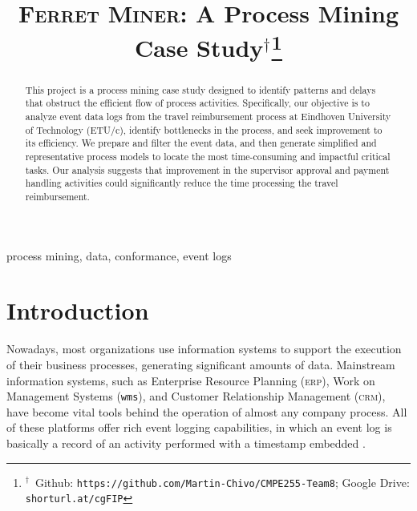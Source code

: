 \documentclass[conference]{IEEEtran}
\begin{document}
\title{\textsc{Ferret Miner}: A Process Mining Case
Study${}^\dagger$\thanks{${}^\dagger$~Github: \texttt{https://github.com/Martin-Chivo/CMPE255-Team8}; Google Drive: \texttt{shorturl.at/cgFIP}}}

\author{
\and
{}
\and
{}
\and
{}
}

\maketitle

\begin{abstract}
This project is a process mining case study designed to
identify patterns and
delays that obstruct the efficient flow of process
activities. Specifically, our
objective is to analyze event data logs from
the travel reimbursement process at Eindhoven University of Technology
(ETU/c), identify bottlenecks in the process, and
seek improvement to its efficiency.
We prepare and filter the event data, and then generate simplified and
representative process models to locate
the most time-consuming and impactful critical tasks.
Our analysis suggests that
improvement in the supervisor approval and payment handling activities 
could significantly
reduce the time processing the travel reimbursement.
\end{abstract}

\begin{IEEEkeywords}
process mining, data, conformance, event logs
\end{IEEEkeywords}

\section{Introduction}
\label{section-intro}


Nowadays, most organizations use information systems to support
the execution of their business processes, generating significant
amounts of data.
Mainstream information systems, such as Enterprise Resource
Planning (\textsc{erp}), Work on Management Systems (\texttt{wms}), and Customer
Relationship Management (\textsc{crm}), have become vital tools behind the
operation of almost 
any company process\cite{Tuto2022}. All of these platforms
offer rich event logging capabilities, in which
an event log is
basically a record of an activity performed with a timestamp embedded
\cite{Proc2022}.
\end{document}
